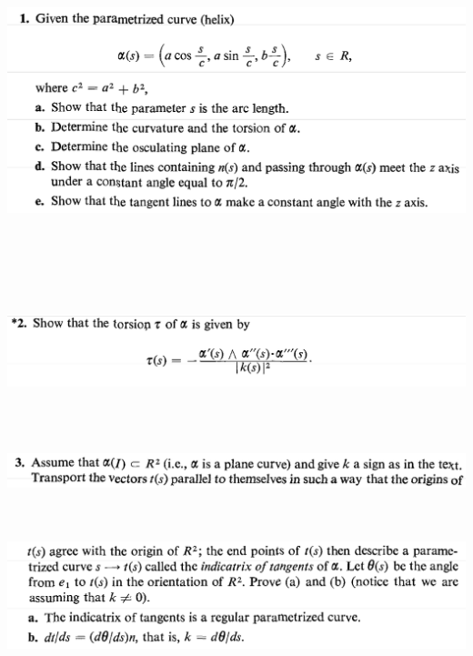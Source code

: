\documentclass{report}
\begin{document}
\begin{question}{}{}
\includegraphics[height=10cm,width=18cm]{hw2q5}
\end{question}
\begin{question}{}{}
\includegraphics[height=3cm,width=18cm]{hw2q4}
\end{question}
\begin{question}{}{}
\includegraphics[height=3cm,width=18cm]{hw2q3}
\includegraphics[height=4cm,width=18cm]{hw2q2}
\end{question}
\end{document}
